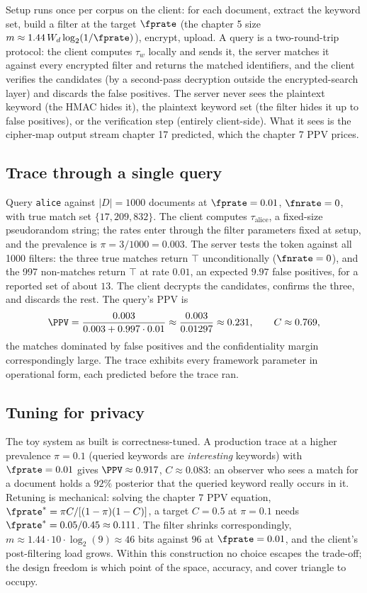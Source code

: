 Setup runs once per corpus on the client: for each document, extract the
keyword set, build a filter at the target $\fprate$ (the chapter 5 size
$m \approx 1.44\,W_d \log_2(1/\fprate)$), encrypt, upload. A query is a
two-round-trip protocol: the client computes $\tau_w$ locally and sends
it, the server matches it against every encrypted filter and returns the
matched identifiers, and the client verifies the candidates (by a
second-pass decryption outside the encrypted-search layer) and discards
the false positives. The server never sees the plaintext keyword (the
HMAC hides it), the plaintext keyword set (the filter hides it up to false
positives), or the verification step (entirely client-side). What it sees
is the cipher-map output stream chapter 17 predicted, which the chapter 7
PPV prices.

\subsection*{Trace through a single query}

Query \texttt{alice} against $|D| = 1000$ documents at $\fprate = 0.01$,
$\fnrate = 0$, with true match set $\{17, 209, 832\}$. The client computes
$\tau_{\mathrm{alice}}$, a fixed-size pseudorandom string; the rates enter
through the filter parameters fixed at setup, and the prevalence is $\pi =
3/1000 = 0.003$. The server tests the token against all 1000 filters: the
three true matches return $\top$ unconditionally ($\fnrate = 0$), and the
997 non-matches return $\top$ at rate $0.01$, an expected $9.97$ false
positives, for a reported set of about $13$. The client decrypts the
candidates, confirms the three, and discards the rest. The query's PPV is
\[
  \PPV = \frac{0.003}{0.003 + 0.997 \cdot 0.01} \approx \frac{0.003}{0.01297}
  \approx 0.231, \qquad C \approx 0.769,
\]
the matches dominated by false positives and the confidentiality margin
correspondingly large. The trace exhibits every framework parameter in
operational form, each predicted before the trace ran.

\subsection*{Tuning for privacy}

The toy system as built is correctness-tuned. A production trace at a
higher prevalence $\pi = 0.1$ (queried keywords are \emph{interesting}
keywords) with $\fprate = 0.01$ gives $\PPV \approx 0.917$, $C \approx
0.083$: an observer who sees a match for a document holds a $92\%$
posterior that the queried keyword really occurs in it. Retuning is mechanical:
solving the chapter 7 PPV equation, $\fprate^* = \pi C / [(1 - \pi)(1 -
C)]$, a target $C = 0.5$ at $\pi = 0.1$ needs $\fprate^* = 0.05/0.45
\approx 0.111$. The filter shrinks correspondingly, $m \approx 1.44 \cdot
10 \cdot \log_2(9) \approx 46$ bits against $96$ at $\fprate = 0.01$, and
the client's post-filtering load grows. Within this construction no choice escapes the trade-off; the design
freedom is which point of the space, accuracy, and cover triangle to
occupy.

